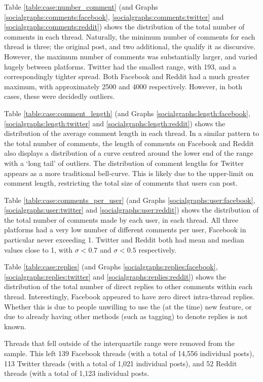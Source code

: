 Table \ref{table:case:number_comment} (and Graphs \ref{socialgraphs:comments:facebook}, \ref{socialgraphs:comments:twitter} and \ref{socialgraphs:comments:reddit}) shows the distribution of the total number of comments in each thread. Naturally, the minimum number of comments for each thread is three; the original post, and two additional, the qualify it as discursive. However, the maximum number of comments was substantially larger, and varied hugely between platforms. Twitter had the smallest range, with 193, and a correspondingly tighter spread. Both Facebook and Reddit had a much greater maximum, with approximately 2500 and 4000 respectively. However, in both cases, these were decidedly outliers. 

Table \ref{table:case:comment_length} (and Graphs \ref{socialgraphs:length:facebook}, \ref{socialgraphs:length:twitter} and \ref{socialgraphs:length:reddit}) shows the distribution of the average comment length in each thread. In a similar pattern to the total number of comments, the length of comments on Facebook and Reddit also displays a  distribution of a curve centred around the lower end of the range with a `long tail' of outliers. The distribution of comment lengths for Twitter appears as a more traditional bell-curve. This is likely due to the upper-limit on comment length, restricting the total size of comments that users can post.

Table \ref{table:case:comments_per_user} (and Graphs \ref{socialgraphs:user:facebook}, \ref{socialgraphs:user:twitter} and \ref{socialgraphs:user:reddit}) shows the distribution of the total number of comments made by each user, in each thread. All three platforms had a very low number of different comments per user, Facebook in particular never exceeding 1. Twitter and Reddit both had mean and median values close to 1, with $\sigma < 0.7$ and $\sigma < 0.5$ respectively.

Table \ref{table:case:replies} (and Graphs \ref{socialgraphs:replies:facebook}, \ref{socialgraphs:replies:twitter} and \ref{socialgraphs:replies:reddit}) shows the distribution of the total number of direct replies to other comments within each thread. Interestingly, Facebook appeared to have zero direct intra-thread replies. Whether this is due to people unwilling to use the (at the time) new feature, or due to already having other methods (such as tagging) to denote replies is not known.


Threads that fell outside of the interquartile range were removed from the sample. This left 139 Facebook threads (with a total of 14,556 individual posts), 113 Twitter threads (with a total of 1,021 individual posts), and 52 Reddit threads (with a total of 1,123 individual posts.

